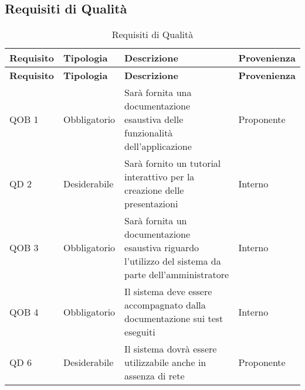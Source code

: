 \subsection{Requisiti di Qualità}{
		\renewcommand*{\arraystretch}{1.4}
		\begin{longtable} [c]{| p{2.5cm} | p{2.5cm} | p{6cm} |p{2.5cm}|}
			\caption{Requisiti di Qualità \label{tab:reqQualita}}\\
			 \hline
			 \textbf{Requisito} & \textbf{Tipologia} & \textbf{Descrizione} & \textbf{Provenienza} \\
			 \hline
			 \endfirsthead
			 \hline
			 \textbf{Requisito} & \textbf{Tipologia} & \textbf{Descrizione} & \textbf{Provenienza} \\
			 \hline
				\endhead
			 \hline
			 \endfoot
			 \hline
			 \endlastfoot
			QOB 1 & Obbligatorio & Sarà fornita una documentazione esaustiva delle funzionalità dell'applicazione & Proponente\\
			\hline
			QD 2 & Desiderabile & Sarà fornito un tutorial interattivo per la creazione delle presentazioni & Interno\\
			\hline
			QOB 3 & Obbligatorio & Sarà fornita un documentazione esaustiva riguardo l'utilizzo del sistema da parte dell'amministratore & Interno\\
			\hline
			QOB 4 & Obbligatorio & Il sistema deve essere accompagnato dalla documentazione sui test eseguiti & Interno\\
			\hline
			QD 6 & Desiderabile & Il sistema dovrà essere utilizzabile anche in assenza di rete & Proponente\\
		\end{longtable}
	}